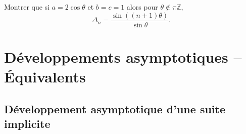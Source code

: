 \begin{exo}
    Montrer que si $a=2\cos\theta$ et $b=c=1$ alors pour $\theta\not\in\pi\mathbb Z$, \[
        \Delta_n=\frac{\sin((n+1)\theta)}{\sin\theta}.
    \]
\end{exo}

\section{Développements asymptotiques -- Équivalents}

\subsection{Développement asymptotique d'une suite implicite}
